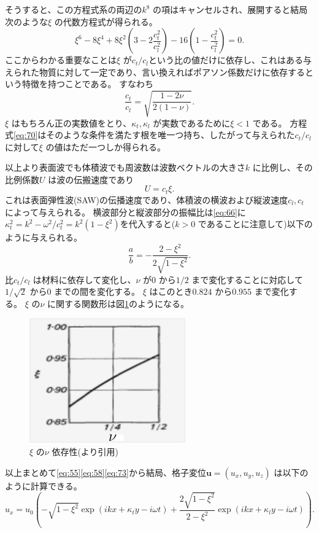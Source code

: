 \documentclass[dvipdfmx,11pt]{jsreport}
\numberwithin{equation}{chapter}
\numberwithin{table}{chapter}
\begin{document}
そうすると、この方程式系の両辺の$k^{8}$ の項はキャンセルされ、展開すると結局次のような$\xi$ の代数方程式が得られる。
\begin{equation}
\label{eq:70}
	\xi^{6}-8\xi^{4}+8\xi^2\left( 3-2 \frac{c_t^2}{c_l^2} \right) -16\left( 1- \frac{c_t^2}{c_l^2} \right) =0
.\end{equation}
ここからわかる重要なことは$\xi$ が$c_t /c_l$という比の値だけに依存し、これはある与えられた物質に対して一定であり、言い換えればポアソン係数だけに依存するという特徴を持つことである。
すなわち
\begin{equation}
\label{eq:71}
	\frac{c_t}{c_l}=\sqrt{\frac{1-2\nu}{2(1-\nu)}} 
.\end{equation}
$\xi$ はもちろん正の実数値をとり、$\kappa_t,\kappa_l$ が実数であるために$\xi<1$ である。
方程式\eqref{eq:70}はそのような条件を満たす根を唯一つ持ち、したがって与えられた$c_t /c_l$ に対して$\xi$ の値はただ一つしか得られる。

以上より表面波でも体積波でも周波数は波数ベクトルの大きさ$k$ に比例し、その比例係数$U$ は波の伝搬速度であり
\begin{equation}
\label{eq:72}
	U=c_t\xi
.\end{equation}
これは表面弾性波(SAW)の伝播速度であり、体積波の横波および縦波速度$c_l,c_t$ によって与えられる。
横波部分と縦波部分の振幅比は\eqref{eq:66}に$\kappa_t^2=k^2-\omega^2 /c_t^2=k^2(1-\xi^2)$を代入すると($k>0$ であることに注意して)以下のように与えられる。
\begin{equation}
\label{eq:73}
	\frac{a}{b}=-\frac{2-\xi^2}{2\sqrt{1-\xi^2} }
.\end{equation}
比$c_t /c_l$ は材料に依存して変化し、$\nu$ が$0$ から$1 /2$ まで変化することに対応して$1 /\sqrt{2} $ から$0$ までの間を変化する。
$\xi$ はこのとき$0.824$ から$0.955$ まで変化する\cite{landau}。
$\xi$ の$\nu$ に関する関数形は図\ref{fig:fig-nu_xi-png}のようになる。
\begin{figure}[H]
	\centering
	\includegraphics[width=0.6\textwidth]{fig/nu_xi.png}
	\caption{$\xi$ の$\nu$ 依存性(\cite{landau}より引用)}
	\label{fig:fig-nu_xi-png}
\end{figure}
以上まとめて\eqref{eq:55}\eqref{eq:58}\eqref{eq:73}から結局、格子変位$\bm{u}=(u_x,u_y,u_z)$ は以下のように計算できる。
\begin{equation}
\label{eq:74}
	u_x=u_0\left( -\sqrt{1-\xi^2} \exp (ikx+\kappa_t y-i\omega t)+\frac{2\sqrt{1-\xi^2} }{2-\xi^2}\exp (ikx + \kappa_l y -i\omega t) \right) 
.\end{equation}
\end{document}
